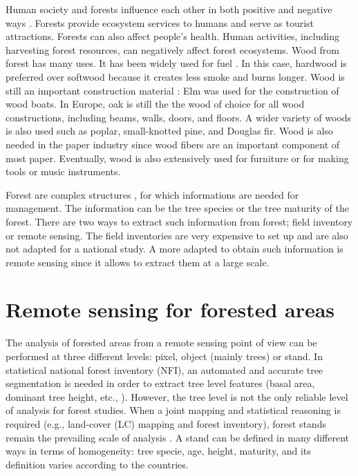 Human society and forests influence each other in both positive and negative ways \citep{vogt2006global}. Forests provide ecosystem services to humans and serve as tourist attractions. Forests can also affect people's health. Human activities, including harvesting forest resources, can negatively affect forest ecosystems. Wood from forest has many uses. It has been widely used for fuel \citep{sterrett1994alternative}. In this case, hardwood is preferred over softwood because it creates less smoke and burns longer.  Wood is still an important construction material \citep{ramage2017wood}: Elm was used for the construction of wood boats. In Europe, oak is still the the wood of choice for all wood constructions, including beams, walls, doors, and floors. A wider variety of woods is also used such as poplar, small-knotted pine, and Douglas fir. Wood is also needed in the paper industry since wood fibers are an important component of most paper. Eventually, wood is also extensively used for furniture or for making tools or music instruments.

Forest are complex structures \citep{pommerening2002approaches}, for which informations are needed for management. The information can be the tree species or the tree maturity of the forest. There are two ways to extract such information from forest; field inventory or remote sensing. The field inventories are very expensive to set up and are also not adapted for a national study. A more adapted to obtain such information is remote sensing since it allows to extract them at a large scale. \\

\section{Remote sensing for forested areas}

The analysis of forested areas from a remote sensing point of view can be performed at three different levels: pixel, object (mainly trees) or stand. In statistical national forest inventory (NFI), an automated and accurate tree segmentation is needed in order to extract tree level features (basal area, dominant tree height, etc., \citep{means2000predicting,Malatamo}). However, the tree level is not the only reliable level of analysis for forest studies. When a joint mapping and statistical reasoning is required (e.g., land-cover (LC) mapping and forest inventory), forest stands remain the prevailing scale of analysis \citep{means2000predicting,White2016CJRS}. A stand can be defined in many different ways in terms of homogeneity: tree specie, age, height, maturity, and its definition varies according to the countries. \\


